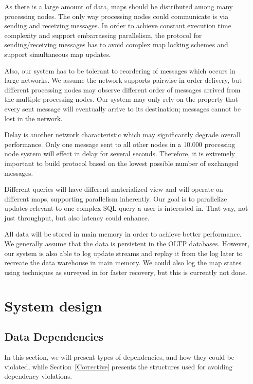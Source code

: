 \documentclass{sig-semester}
\begin{document}
As there is a large amount of data, maps should be distributed among many processing nodes. The only way processing nodes could communicate is via sending and receiving messages. In order to achieve constant execution time complexity and support embarrassing parallelism, the protocol for sending/receiving messages has to avoid complex map locking schemes and support simultaneous map updates.

Also, our system has to be tolerant to reordering of messages which occurs in large networks. We assume the network supports pairwise in-order delivery, but different processing nodes may observe different order of messages arrived from the multiple processing nodes. Our system may only rely on the property that every sent message will eventually arrive to its destination; messages cannot be lost in the network.

Delay is another network characteristic which may significantly degrade overall performance. Only one message sent to all other nodes in a 10.000 processing node system will effect in delay for several seconds. Therefore, it is extremely important to build protocol based on the lowest possible number of exchanged messages.
 
Different queries will have different materialized view and will operate on different maps, supporting parallelism inherently. Our goal is to parallelize updates relevant to one complex SQL query a user is interested in. That way, not just throughput, but also latency could enhance.

All data will be stored in main memory in order to achieve better performance. 
We generally assume that the data is persistent in the OLTP databases.
However, our system is also able to
log update streams and replay it from the
log later to recreate the data warehouse in main memory.
We could also log the map states using techniques as surveyed in
\cite{DBLP:journals/pvldb/SallesCSDGKW09}
for faster recovery, but this is currently not done.

\section{System design}
\label{sec:sysdesign}
\vspace{2mm}

\subsection{Data Dependencies}
In this section, we will present types of dependencies, and how they could be violated, while Section~\ref{Corrective} presents the structures used for avoiding dependency violations.
\end{document}
